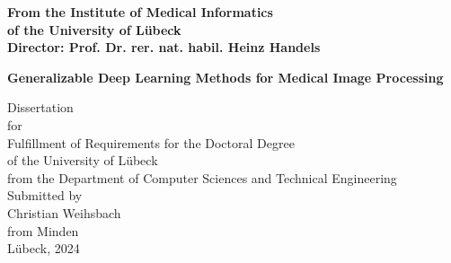 \begin{titlepage}

    \addtolength{\topmargin}{-1.2cm}
    \addtolength{\textwidth}{2.35cm}

    \vspace*{-2.7cm}
    \vspace*{0.4cm}

    \begin{center}


        \enlargethispage{5cm}
        \textbf{From the Institute of Medical Informatics}\\
        \textbf{of the University of Lübeck}\\
        \textbf{Director: Prof. Dr. rer. nat. habil. Heinz Handels}\\[2.8cm]
        \begin{Large}
            \textbf{Generalizable Deep Learning Methods for Medical Image Processing
            }\\ %
        \end{Large}

        \vspace*{2.5cm}

        Dissertation\\
        for\\
        Fulfillment of Requirements for the Doctoral Degree\\
        of the University of Lübeck\\[1.0cm]
        from the Department of Computer Sciences and Technical Engineering\\[1.0cm]
        Submitted by\\[0.1cm]
        Christian Weihsbach\\[0.1cm]
        from Minden\\[3.0cm]
        Lübeck, 2024
        \end{center}


    \newpage
    \thispagestyle{empty}

    \addtolength{\topmargin}{1.2cm}
    \addtolength{\textwidth}{-2.35cm}
\end{titlepage}

